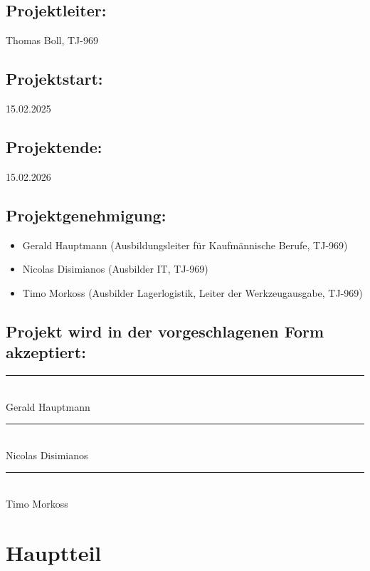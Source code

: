 \documentclass[a4paper, 12pt]{article}
\begin{document}
\vspace{1cm}

\subsection*{Projektleiter:} Thomas Boll, TJ-969
\subsection*{Projektstart:} 15.02.2025
\subsection*{Projektende:} 15.02.2026
\subsection*{Projektgenehmigung:}
\begin{itemize}
    \item Gerald Hauptmann (Ausbildungsleiter für Kaufmännische Berufe, TJ-969)
    \item Nicolas Disimianos (Ausbilder IT, TJ-969)
    \item Timo Morkoss (Ausbilder Lagerlogistik, Leiter der Werkzeugausgabe, TJ-969)
\end{itemize}

\vspace{1cm}

\subsection*{Projekt wird in der vorgeschlagenen Form akzeptiert:}

\vfill

\begin{center}
\parbox{4cm}{\centering \rule{4cm}{0.4pt} \\[0.2cm] Gerald Hauptmann} \hfill
\parbox{4cm}{\centering \rule{4cm}{0.4pt} \\[0.2cm] Nicolas Disimianos} \hfill
\parbox{4cm}{\centering \rule{4cm}{0.4pt} \\[0.2cm] Timo Morkoss}
\end{center}

\vspace{1cm}

\newpage


\section{Hauptteil}
\end{document}
